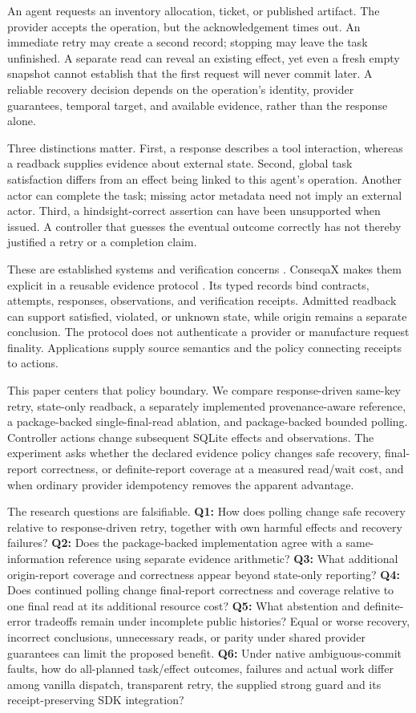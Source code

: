 \documentclass[conference]{IEEEtran}
\begin{document}
An agent requests an inventory allocation, ticket, or published artifact. The provider accepts the operation, but the acknowledgement times out. An immediate retry may create a second record; stopping may leave the task unfinished. A separate read can reveal an existing effect, yet even a fresh empty snapshot cannot establish that the first request will never commit later. A reliable recovery decision depends on the operation's identity, provider guarantees, temporal target, and available evidence, rather than the response alone.

Three distinctions matter. First, a response describes a tool interaction, whereas a readback supplies evidence about external state. Second, global task satisfaction differs from an effect being linked to this agent's operation. Another actor can complete the task; missing actor metadata need not imply an external actor. Third, a hindsight-correct assertion can have been unsupported when issued. A controller that guesses the eventual outcome correctly has not thereby justified a retry or a completion claim.

These are established systems and verification concerns \cite{helland,vogels,verified,operability,agenttool,limbo}. ConseqaX makes them explicit in a reusable evidence protocol \cite{artifact}. Its typed records bind contracts, attempts, responses, observations, and verification receipts. Admitted readback can support satisfied, violated, or unknown state, while origin remains a separate conclusion. The protocol does not authenticate a provider or manufacture request finality. Applications supply source semantics and the policy connecting receipts to actions.

This paper centers that policy boundary. We compare response-driven same-key retry, state-only readback, a separately implemented provenance-aware reference, a package-backed single-final-read ablation, and package-backed bounded polling. Controller actions change subsequent SQLite effects and observations. The experiment asks whether the declared evidence policy changes safe recovery, final-report correctness, or definite-report coverage at a measured read/wait cost, and when ordinary provider idempotency removes the apparent advantage.

The research questions are falsifiable. \textbf{Q1:} How does polling change safe recovery relative to response-driven retry, together with own harmful effects and recovery failures? \textbf{Q2:} Does the package-backed implementation agree with a same-information reference using separate evidence arithmetic? \textbf{Q3:} What additional origin-report coverage and correctness appear beyond state-only reporting? \textbf{Q4:} Does continued polling change final-report correctness and coverage relative to one final read at its additional resource cost? \textbf{Q5:} What abstention and definite-error tradeoffs remain under incomplete public histories? Equal or worse recovery, incorrect conclusions, unnecessary reads, or parity under shared provider guarantees can limit the proposed benefit. \textbf{Q6:} Under native ambiguous-commit faults, how do all-planned task/effect outcomes, failures and actual work differ among vanilla dispatch, transparent retry, the supplied strong guard and its receipt-preserving SDK integration?
\end{document}
